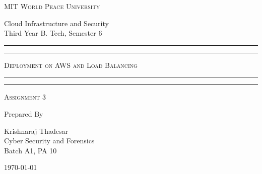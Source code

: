 \documentclass[11pt]{article}
\begin{document}
\begin{titlepage}
    \centering


    \huge\textsc{
        MIT World Peace University
    }\\

    \vspace{0.75\baselineskip} %

    \LARGE{
        Cloud Infrastructure and Security\\
        Third Year B. Tech, Semester 6
    }

    \vfill %


    \rule{\textwidth}{1.6pt}\vspace*{-\baselineskip}\vspace*{2pt}
    \rule{\textwidth}{0.6pt}
    \vspace{0.75\baselineskip} %



    \huge{\textsc{
            Deployment on AWS and Load Balancing
        }} \\



    \vspace{0.5\baselineskip} %
    \rule{\textwidth}{0.6pt}\vspace*{-\baselineskip}\vspace*{2.8pt}
    \rule{\textwidth}{1.6pt}

    \vspace{1\baselineskip} %


    \LARGE\textsc{
        Assignment 3
    } %
    \vfill


    Prepared By
    \vspace{0.5\baselineskip} %

    \Large{
        Krishnaraj Thadesar \\
        Cyber Security and Forensics\\
        Batch A1, PA 10
    }


    \vspace{0.5\baselineskip} %
    \today

\end{titlepage}
\end{document}
